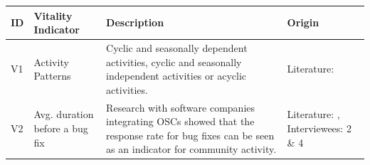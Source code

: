 \documentclass[final,5p,times,twocolumn]{elsarticle}
\begin{document}
\begin{table}
\label{tab:vitality_indicators}
    \begin{tabular}{|p{0.5cm}|p{2.5cm}|p{10cm}|p{3.5cm}|}
    \hline
    \textbf{ID}  & \textbf{Vitality Indicator}                                           & \textbf{Description}                                                      & \textbf{Origin}                           \\ \hline
    V1  & Activity Patterns                                            & Cyclic and seasonally dependent activities, cyclic and seasonally independent activities or acyclic activities.& Literature: \cite{Yu2009} \\ \hline

	V2  &Avg. duration before a bug fix& Research with software companies integrating OSCs showed that the response rate for bug fixes can be seen as an indicator for community activity. & Literature: \cite{Maki-Asiala2006}, Interviewees: 2 \& 4         \\ \hline    
    

\end{tabular}
\end{table}
\end{document}
